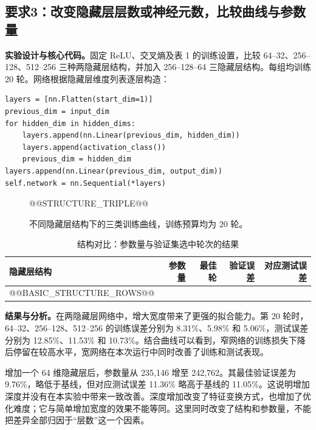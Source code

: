 \documentclass[UTF8,11pt,a4paper,fontset=fandol]{ctexart}
\newcommand{\question}[1]{\Needspace{14\baselineskip}\subsection{#1}}
\begin{document}
\question{要求3：改变隐藏层层数或神经元数，比较曲线与参数量}
\textbf{实验设计与核心代码。}固定 ReLU、交叉熵及表 1 的训练设置，比较 64--32、256--128、512--256 三种两隐藏层结构，并加入 256--128--64 三隐藏层结构。每组均训练 20 轮。网络根据隐藏层维度列表逐层构造：
\par\noindent\begin{minipage}{\linewidth}
\begin{lstlisting}
layers = [nn.Flatten(start_dim=1)]
previous_dim = input_dim
for hidden_dim in hidden_dims:
    layers.append(nn.Linear(previous_dim, hidden_dim))
    layers.append(activation_class())
    previous_dim = hidden_dim
layers.append(nn.Linear(previous_dim, output_dim))
self.network = nn.Sequential(*layers)
\end{lstlisting}
\end{minipage}\par
\begin{figure}[H]\centering
@@STRUCTURE_TRIPLE@@
\caption{不同隐藏层结构下的三类训练曲线，训练预算均为 20 轮。}\label{fig:structure}
\end{figure}
\begin{table}[H]\centering\small
\caption{结构对比：参数量与验证集选中轮次的结果}
\begin{tabular}{lrrrr}\toprule
隐藏层结构 & 参数量 & 最佳轮 & 验证误差 & 对应测试误差 \\\midrule
@@BASIC_STRUCTURE_ROWS@@
\bottomrule\end{tabular}
\end{table}
\textbf{结果与分析。}在两隐藏层网络中，增大宽度带来了更强的拟合能力。第 20 轮时，64--32、256--128、512--256 的训练误差分别为 8.31\%、5.98\% 和 5.06\%，测试误差分别为 12.85\%、11.53\% 和 10.73\%。结合曲线可以看到，窄网络的训练损失下降后停留在较高水平，宽网络在本次运行中同时改善了训练和测试表现。

增加一个 64 维隐藏层后，参数量从 235,146 增至 242,762。其最佳验证误差为 9.76\%，略低于基线，但对应测试误差 11.36\% 略高于基线的 11.05\%。这说明增加深度并没有在本实验中带来一致改善。深度增加改变了特征变换方式，也增加了优化难度；它与简单增加宽度的效果不能等同。这里同时改变了结构和参数量，不能把差异全部归因于“层数”这一个因素。
\end{document}
